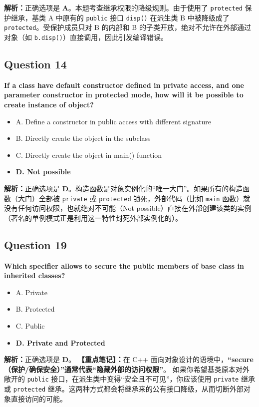 \documentclass[11pt, a4paper]{article}
\begin{document}
\textbf{解析：}正确选项是 \textbf{A}。本题考查继承权限的降级规则。由于使用了 \texttt{protected} 保护继承，基类 A 中原有的 \texttt{public} 接口 \texttt{disp()} 在派生类 B 中被降级成了 \texttt{protected}。受保护成员只对 B 的内部和 B 的子类开放，绝对不允许在外部通过对象（如 \texttt{b.disp()}）直接调用，因此引发编译错误。


\subsection*{Question 14}
\textbf{If a class have default constructor defined in private access, and one parameter constructor in protected mode, how will it be possible to create instance of object?}
\begin{itemize}
    \item A. Define a constructor in public access with different signature
    \item B. Directly create the object in the subclass
    \item C. Directly create the object in main() function
    \item \textbf{D. Not possible}
\end{itemize}

\textbf{解析：}正确选项是 \textbf{D}。构造函数是对象实例化的“唯一大门”。如果所有的构造函数（大门）全部被 \texttt{private} 或 \texttt{protected} 锁死，外部代码（比如 \texttt{main} 函数）就没有任何访问权限，也就绝对不可能（Not possible）直接在外部创建该类的实例（著名的单例模式正是利用这一特性封死外部实例化的）。


\subsection*{Question 19}
\textbf{Which specifier allows to secure the public members of base class in inherited classes?}
\begin{itemize}
    \item A. Private
    \item B. Protected
    \item C. Public
    \item \textbf{D. Private and Protected}
\end{itemize}

\textbf{解析：}正确选项是 \textbf{D}。
\textbf{【重点笔记】：}在 C++ 面向对象设计的语境中，\textbf{“secure（保护/确保安全）”通常代表“隐藏外部的访问权限”}。
如果你希望基类原本对外敞开的 \texttt{public} 接口，在派生类中变得“安全且不可见”，你应该使用 \texttt{private} 继承或 \texttt{protected} 继承。这两种方式都会将继承来的公有接口降级，从而切断外部对象直接访问的可能。
\end{document}
